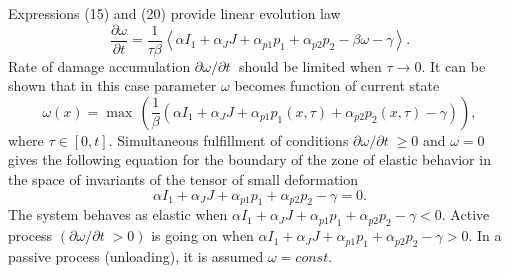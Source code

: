 \documentclass[article,authoryear,jpm]{beg_39}             %
\begin{document}
Expressions (15) and (20) provide linear evolution law
\begin{equation}
\frac{\partial \omega }{\partial t}=\frac{1}{\tau \beta }\left\langle \alpha {{I}_{1}}+{{\alpha }_{J}}J+{{\alpha }_{p1}}{{p}_{1}}+{{\alpha }_{p2}}{{p}_{2}}-\beta \omega -\gamma \right\rangle.
\end{equation}
Rate of damage accumulation ${\partial \omega }/{\partial t}\;$ should be limited when $\tau \to 0$.
It can be shown that in this case parameter $\omega$ becomes function of current state
\begin{equation}
\omega(x) ={\mathop{\max}}\,\left( \frac{1}{\beta }\left( \alpha {{I}_{1}}+{{\alpha }_{J}}J+{{\alpha}_{p1}}{{p}_{1}(x,\tau)}+{{\alpha}_{p2}}{{p}_{2}(x,\tau)}-\gamma  \right) \right),
\end{equation}
where $\tau \in [0,t]$.
Simultaneous fulfillment of conditions ${\partial \omega }/{\partial t}\;\ge 0$ and $\omega =0$ gives the following equation for the boundary of the zone of elastic behavior in the space of invariants of the tensor of small deformation
\begin{equation}
\alpha {{I}_{1}}+{{\alpha }_{J}}J+{{\alpha }_{p1}}{{p}_{1}}+{{\alpha }_{p2}}{{p}_{2}}-\gamma =0.
\end{equation}
The system behaves as elastic when $\alpha {{I}_{1}}+{{\alpha }_{J}}J+{{\alpha }_{p1}}{{p}_{1}}+{{\alpha }_{p2}}{{p}_{2}}-\gamma <0$. Active process $({\partial \omega }/{\partial t}\;>0)$ is going on when $\alpha {{I}_{1}}+{{\alpha }_{J}}J+{{\alpha }_{p1}}{{p}_{1}}+{{\alpha }_{p2}}{{p}_{2}}-\gamma >0$. In a passive process (unloading), it is assumed $\omega =const$.
\end{document}
